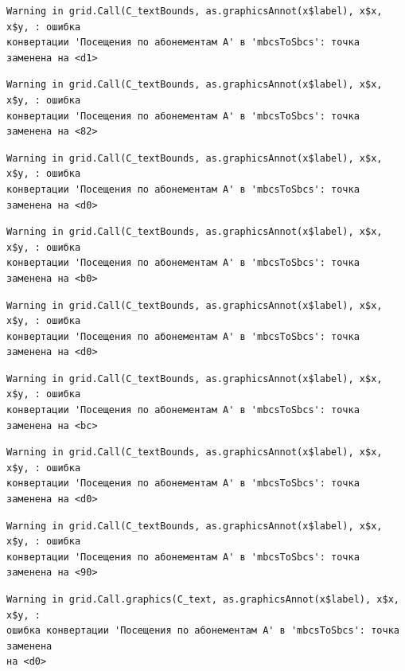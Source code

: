 \documentclass[
  letterpaper,
  DIV=11,
  numbers=noendperiod]{scrreprt}
\begin{document}
\begin{verbatim}
Warning in grid.Call(C_textBounds, as.graphicsAnnot(x$label), x$x, x$y, : ошибка
конвертации 'Посещения по абонементам А' в 'mbcsToSbcs': точка заменена на <d1>
\end{verbatim}

\begin{verbatim}
Warning in grid.Call(C_textBounds, as.graphicsAnnot(x$label), x$x, x$y, : ошибка
конвертации 'Посещения по абонементам А' в 'mbcsToSbcs': точка заменена на <82>
\end{verbatim}

\begin{verbatim}
Warning in grid.Call(C_textBounds, as.graphicsAnnot(x$label), x$x, x$y, : ошибка
конвертации 'Посещения по абонементам А' в 'mbcsToSbcs': точка заменена на <d0>
\end{verbatim}

\begin{verbatim}
Warning in grid.Call(C_textBounds, as.graphicsAnnot(x$label), x$x, x$y, : ошибка
конвертации 'Посещения по абонементам А' в 'mbcsToSbcs': точка заменена на <b0>
\end{verbatim}

\begin{verbatim}
Warning in grid.Call(C_textBounds, as.graphicsAnnot(x$label), x$x, x$y, : ошибка
конвертации 'Посещения по абонементам А' в 'mbcsToSbcs': точка заменена на <d0>
\end{verbatim}

\begin{verbatim}
Warning in grid.Call(C_textBounds, as.graphicsAnnot(x$label), x$x, x$y, : ошибка
конвертации 'Посещения по абонементам А' в 'mbcsToSbcs': точка заменена на <bc>
\end{verbatim}

\begin{verbatim}
Warning in grid.Call(C_textBounds, as.graphicsAnnot(x$label), x$x, x$y, : ошибка
конвертации 'Посещения по абонементам А' в 'mbcsToSbcs': точка заменена на <d0>
\end{verbatim}

\begin{verbatim}
Warning in grid.Call(C_textBounds, as.graphicsAnnot(x$label), x$x, x$y, : ошибка
конвертации 'Посещения по абонементам А' в 'mbcsToSbcs': точка заменена на <90>
\end{verbatim}

\begin{verbatim}
Warning in grid.Call.graphics(C_text, as.graphicsAnnot(x$label), x$x, x$y, :
ошибка конвертации 'Посещения по абонементам А' в 'mbcsToSbcs': точка заменена
на <d0>
\end{verbatim}
\end{document}
